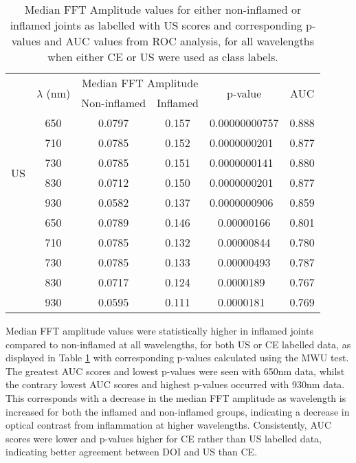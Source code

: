\documentclass[twoside]{bhamthesis}
\theoremstyle{definition}
\begin{document}
\begin{table}[!ht]
\caption{Median FFT Amplitude values for either non-inflamed or inflamed joints as labelled with US scores and corresponding p-values and AUC values from ROC analysis, for all wavelengths when either CE or US were used as class labels.} 
\label{tab:diagnostic accuracy}
\begin{center}       
\begin{tabular}{c c c c c c}
\hline
\rule[-1ex]{0pt}{3.5ex} & \multirow{ 2}{*}{$\lambda$ (nm)} & \multicolumn{2}{c}{Median FFT Amplitude}  & \multirow{ 2}{*}{p-value} & \multirow{ 2}{*}{AUC}\\
& & Non-inflamed & Inflamed & & \\
\hline
\multirow{6}{*}{US} & \rule[-1ex]{0pt}{3.5ex}  650 & 0.0797 & 0.157 & 0.00000000757 & 0.888  \\
 & \rule[-1ex]{0pt}{3.5ex}  710 & 0.0785 & 0.152 &  0.0000000201\textcolor{white}{0}  & 0.877\\
 & \rule[-1ex]{0pt}{3.5ex}  730 & 0.0785 & 0.151 & 0.0000000141\textcolor{white}{0}  & 0.880\\
 & \rule[-1ex]{0pt}{3.5ex}  830  & 0.0712 & 0.150 & 0.0000000201\textcolor{white}{0} & 0.877\\
 & \rule[-1ex]{0pt}{3.5ex}  930  & 0.0582 & 0.137 &  0.0000000906\textcolor{white}{0}& 0.859\\
\hline
\multirow{6}{*}{CE} & \rule[-1ex]{0pt}{3.5ex}  650 & 0.0789 & 0.146 & 0.00000166 & 0.801 \\
 & \rule[-1ex]{0pt}{3.5ex}  710 & 0.0785 & 0.132 & 0.00000844 & 0.780 \\
 & \rule[-1ex]{0pt}{3.5ex}  730 & 0.0785 & 0.133 & 0.00000493  & 0.787 \\
 & \rule[-1ex]{0pt}{3.5ex}  830 & 0.0717 & 0.124 & 0.0000189\textcolor{white}{0} & 0.767\\
 & \rule[-1ex]{0pt}{3.5ex}  930 & 0.0595 & 0.111 & 0.0000181\textcolor{white}{0} & 0.769\\
\hline
\end{tabular}
\end{center}
\end{table}

Median FFT amplitude values were statistically higher in inflamed joints compared to non-inflamed at all wavelengths, for both US or CE labelled data, as displayed in Table \ref{tab:diagnostic accuracy} with corresponding p-values calculated using the MWU test. The greatest AUC scores and lowest p-values were seen with 650nm data, whilst the contrary lowest AUC scores and highest p-values occurred with 930nm data. This corresponds with a decrease in the median FFT amplitude as wavelength is increased for both the inflamed and non-inflamed groups, indicating a decrease in optical contrast from inflammation at higher wavelengths. Consistently, AUC scores were lower and p-values higher for CE rather than US labelled data, indicating better agreement between DOI and US than CE.
\end{document}
